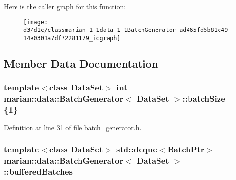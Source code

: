 Here is the caller graph for this function\+:
\nopagebreak
\begin{figure}[H]
\begin{center}
\leavevmode
\texttt{[image: d3/d1c/classmarian\_1\_1data\_1\_1BatchGenerator\_ad465fd5b81c4914e0301a7df72281179\_icgraph]}
\end{center}
\end{figure}




\subsection{Member Data Documentation}
\subsubsection[{\texorpdfstring{batch\+Size\+\_\+}{batchSize_}}]{\setlength{\rightskip}{0pt plus 5cm}template$<$class Data\+Set$>$ int {\bf marian\+::data\+::\+Batch\+Generator}$<$ Data\+Set $>$\+::batch\+Size\+\_\+ \{1\}\hspace{0.3cm}{\ttfamily [private]}}\hypertarget{classmarian_1_1data_1_1BatchGenerator_ae71699877e61295dbf3c4f544a1a73ea}{}\label{classmarian_1_1data_1_1BatchGenerator_ae71699877e61295dbf3c4f544a1a73ea}


Definition at line 31 of file batch\+\_\+generator.\+h.

\subsubsection[{\texorpdfstring{buffered\+Batches\+\_\+}{bufferedBatches_}}]{\setlength{\rightskip}{0pt plus 5cm}template$<$class Data\+Set$>$ std\+::deque$<${\bf Batch\+Ptr}$>$ {\bf marian\+::data\+::\+Batch\+Generator}$<$ Data\+Set $>$\+::buffered\+Batches\+\_\+\hspace{0.3cm}{\ttfamily [private]}}\hypertarget{classmarian_1_1data_1_1BatchGenerator_a9e04fb7830ea05e42c0505d4f2077d70}{}\label{classmarian_1_1data_1_1BatchGenerator_a9e04fb7830ea05e42c0505d4f2077d70}



